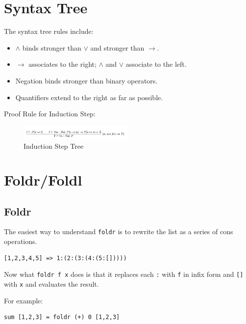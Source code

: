 \documentclass{article}
\begin{document}
\section{Syntax Tree}

The syntax tree rules include:
\begin{itemize}
    \item $\land$ binds stronger than $\lor$ and stronger than $\rightarrow$.
    \item $\rightarrow$ associates to the right; $\land$ and $\lor$ associate to the left.
    \item Negation binds stronger than binary operators.
    \item Quantifiers extend to the right as far as possible.
\end{itemize}

Proof Rule for Induction Step:

\begin{figure}[ht]
    \centering
    \includegraphics[width=0.5\textwidth]{assets/induction-step-tree.png}
    \caption{Induction Step Tree}
\end{figure}

\section{Foldr/Foldl}


\subsection{Foldr}



The easiest way to understand \texttt{foldr} is to rewrite the list as a series of cons operations.

\begin{lstlisting}[style=haskellstyle, caption=Haskell Code, label=code:haskell]
[1,2,3,4,5] => 1:(2:(3:(4:(5:[]))))
\end{lstlisting}

Now what \texttt{foldr f x} does is that it replaces each \texttt{:} with \texttt{f} in infix form and \texttt{[]} with \texttt{x} and evaluates the result.

For example:

\begin{lstlisting}[style=haskellstyle, caption=Haskell Code, label=code:haskell]
sum [1,2,3] = foldr (+) 0 [1,2,3]
\end{lstlisting}
\end{document}
